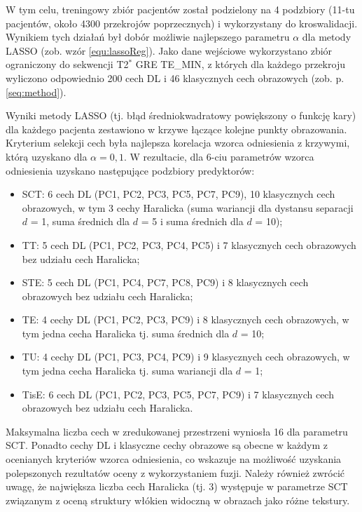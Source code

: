 W tym celu, treningowy zbiór pacjentów został podzielony na 4 podzbiory (11-tu pacjentów, około 4300 przekrojów poprzecznych) i wykorzystany do kroswalidacji. Wynikiem tych działań był dobór możliwie najlepszego parametru $\alpha$ dla metody LASSO (zob. wzór \ref{equ:lassoReg}). Jako dane wejściowe wykorzystano zbiór ograniczony do sekwencji T2$^\ast$ GRE TE\_MIN, z których dla każdego przekroju wyliczono odpowiednio 200 cech DL i 46 klasycznych cech obrazowych (zob. p. \ref{seq:method}).

Wyniki metody LASSO (tj. błąd średniokwadratowy powiększony o funkcję kary) dla każdego pacjenta zestawiono w krzywe łączące kolejne punkty obrazowania.
Kryterium selekcji cech była najlepsza korelacja wzorca odniesienia z krzywymi, którą uzyskano dla $\alpha=0,1$. W rezultacie, dla 6-ciu parametrów wzorca odniesienia uzyskano następujące podzbiory predyktorów:  
\begin{itemize}[noitemsep,nolistsep]
	\item SCT: 6 cech DL (PC1, PC2, PC3, PC5, PC7, PC9), 10 klasycznych cech obrazowych, w tym 3 cechy Haralicka (suma wariancji dla dystansu separacji $d$ = 1, suma średnich dla $d$ = 5 i suma średnich dla $d$ = 10);
	\item TT: 5 cech DL (PC1, PC2, PC3, PC4, PC5) i 7 klasycznych cech obrazowych bez udziału cech Haralicka;
	\item STE: 5 cech DL (PC1, PC4, PC7, PC8, PC9) i 8 klasycznych cech obrazowych bez udziału cech Haralicka;
	\item TE: 4 cechy DL (PC1, PC2, PC3, PC9) i 8 klasycznych cech obrazowych, \linebreak w tym jedna cecha Haralicka tj. suma średnich dla $d$ = 10;
	\item TU: 4 cechy DL (PC1, PC3, PC4, PC9) i 9 klasycznych cech obrazowych, \linebreak w tym jedna cecha Haralicka tj. suma wariancji dla $d$ = 1;  
	\item TisE: 6 cech DL (PC1, PC2, PC3, PC5, PC7, PC9) i 7 klasycznych cech obrazowych bez udziału cech Haralicka.
	
\end{itemize}
Maksymalna liczba cech w zredukowanej przestrzeni wyniosła 16 dla parametru SCT. Ponadto cechy DL i klasyczne cechy obrazowe są obecne w każdym z ocenianych kryteriów wzorca odniesienia, co wskazuje na możliwość uzyskania polepszonych rezultatów oceny z wykorzystaniem fuzji. Należy również zwrócić uwagę, \linebreak że największa liczba cech Haralicka (tj. 3) występuje w parametrze SCT związanym z oceną struktury włókien widoczną w obrazach jako różne tekstury.

